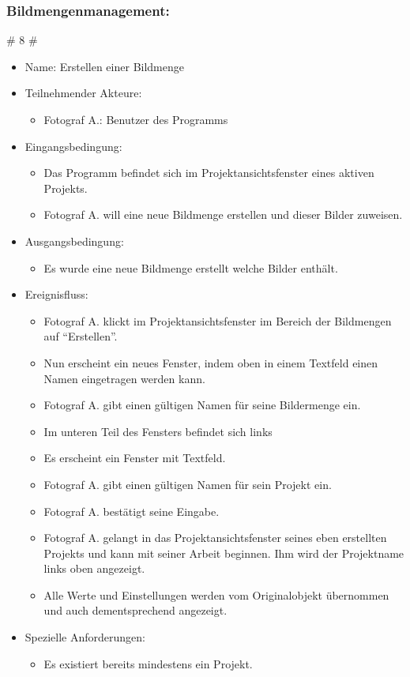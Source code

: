 	\subsubsection{Bildmengenmanagement:}
	
	\# 8 \#
	\begin{itemize}
		\item Name: Erstellen einer Bildmenge
		\item Teilnehmender Akteure:
		\begin{itemize}
			\item	Fotograf A.: Benutzer des Programms		
		\end{itemize}
		\item Eingangsbedingung:
		\begin{itemize}
			\item	Das Programm befindet sich im Projektansichtsfenster eines aktiven Projekts.
			\item Fotograf A. will eine neue Bildmenge erstellen und dieser Bilder zuweisen.
		\end{itemize}
		\item Ausgangsbedingung:
		\begin{itemize}
			\item	Es wurde eine neue Bildmenge erstellt welche Bilder enthält.	
		\end{itemize}
		\item Ereignisfluss:
		\begin{itemize}
			\item Fotograf A. klickt im Projektansichtsfenster im Bereich der Bildmengen auf "`Erstellen"'.		
			\item Nun erscheint ein neues Fenster, indem oben in einem Textfeld einen Namen eingetragen werden kann.
			\item Fotograf A. gibt einen gültigen Namen für seine Bildermenge ein.
			\item Im unteren Teil des Fensters befindet sich links
			\item Es erscheint ein Fenster mit Textfeld.
			\item Fotograf A. gibt einen gültigen Namen für sein Projekt ein.
			\item Fotograf A. bestätigt seine Eingabe.
			\item Fotograf A. gelangt in das Projektansichtsfenster seines eben erstellten Projekts und kann mit seiner Arbeit beginnen. Ihm wird der Projektname links oben angezeigt.
			\item Alle Werte und Einstellungen werden vom Originalobjekt übernommen und auch dementsprechend angezeigt.
		\end{itemize}
		\item Spezielle Anforderungen:
		\begin{itemize}
			\item	Es existiert bereits mindestens ein Projekt.		
		\end{itemize}			
	\end{itemize}
